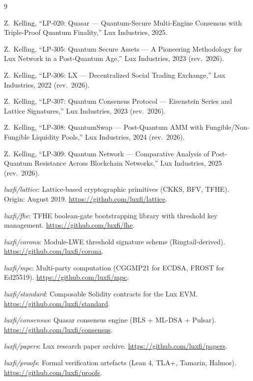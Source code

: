 \documentclass[11pt,a4paper]{article}
\begin{document}

\begin{thebibliography}{9}

Z.~Kelling, ``LP-020: Quasar --- Quantum-Secure Multi-Engine Consensus
with Triple-Proof Quantum Finality,'' Lux Industries, 2025.

Z.~Kelling, ``LP-305: Quantum Secure Assets --- A Pioneering Methodology
for Lux Network in a Post-Quantum Age,'' Lux Industries, 2023 (rev.\ 2026).

Z.~Kelling, ``LP-306: LX --- Decentralized Social Trading Exchange,''
Lux Industries, 2022 (rev.\ 2026).

Z.~Kelling, ``LP-307: Quantum Consensus Protocol --- Eisenstein Series
and Lattice Signatures,'' Lux Industries, 2023 (rev.\ 2026).

Z.~Kelling, ``LP-308: QuantumSwap --- Post-Quantum AMM with
Fungible/Non-Fungible Liquidity Pools,'' Lux Industries, 2024 (rev.\ 2026).

Z.~Kelling, ``LP-309: Quantum Network --- Comparative Analysis of
Post-Quantum Resistance Across Blockchain Networks,'' Lux Industries,
2025 (rev.\ 2026).

\textit{luxfi/lattice}: Lattice-based cryptographic primitives (CKKS,
BFV, TFHE). Origin: August 2019. \url{https://github.com/luxfi/lattice}.

\textit{luxfi/fhe}: TFHE boolean-gate bootstrapping library with
threshold key management. \url{https://github.com/luxfi/fhe}.

\textit{luxfi/corona}: Module-LWE threshold signature scheme (Ringtail-derived).
\url{https://github.com/luxfi/corona}.

\textit{luxfi/mpc}: Multi-party computation (CGGMP21 for ECDSA, FROST
for Ed25519). \url{https://github.com/luxfi/mpc}.

\textit{luxfi/standard}: Composable Solidity contracts for the Lux EVM.
\url{https://github.com/luxfi/standard}.

\textit{luxfi/consensus}: Quasar consensus engine (BLS + ML-DSA +
Pulsar). \url{https://github.com/luxfi/consensus}.

\textit{luxfi/papers}: Lux research paper archive.
\url{https://github.com/luxfi/papers}.

\textit{luxfi/proofs}: Formal verification artefacts (Lean 4, TLA+,
Tamarin, Halmos). \url{https://github.com/luxfi/proofs}.

\end{thebibliography}
\end{document}
